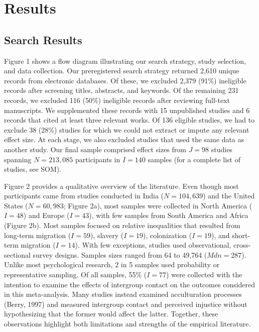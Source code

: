 \documentclass[12pt, letterpaper]{article}
\begin{document}
\hypertarget{results}{%
\section{Results}\label{results}}

\hypertarget{search-results}{%
\subsection{Search Results}\label{search-results}}

Figure 1 shows a flow diagram illustrating our search strategy, study
selection, and data collection. Our preregistered search strategy
returned 2,610 unique records from electronic databases. Of these, we
excluded 2,379 (91\%) ineligible records after screening titles,
abstracts, and keywords. Of the remaining 231 records, we excluded 116
(50\%) ineligible records after reviewing full-text manuscripts. We
supplemented these records with 15 unpublished studies and 6 records
that cited at least three relevant works. Of 136 eligible studies, we
had to exclude 38 (28\%) studies for which we could not extract or
impute any relevant effect size. At each stage, we also excluded studies
that used the same data as another study. Our final sample comprised
effect sizes from \(J = 98\) studies spanning \(N = 213,085\)
participants in \(I = 140\) samples (for a complete list of studies, see
SOM).

Figure 2 provides a qualitative overview of the literature. Even though
most participants came from studies conducted in India (\(N = 104,639\))
and the United States (\(N = 60,983\); Figure 2a), most samples were
collected in North America (\(I = 48\)) and Europe (\(I = 43\)), with
few samples from South America and Africa (Figure 2b). Most samples
focused on relative inequalities that resulted from long-term migration
(\(I = 59\)), slavery (\(I = 19\)), colonization (\(I = 19\)), and
short-term migration (\(I = 14\)). With few exceptions, studies used
observational, cross-sectional survey designs. Samples sizes ranged from
64 to 49,764 (\(\textit{Mdn} = 287\)). Unlike most psychological
research, 2 in 5 samples used probability or representative sampling. Of
all samples, 55\% (\(I = 77\)) were collected with the intention to
examine the effects of intergroup contact on the outcomes considered in
this meta-analysis. Many studies instead examined acculturation
processes (Berry, 1997) and measured intergroup contact and perceived
injustice without hypothesizing that the former would affect the latter.
Together, these observations highlight both limitations and strengths of
the empirical literature.
\end{document}
